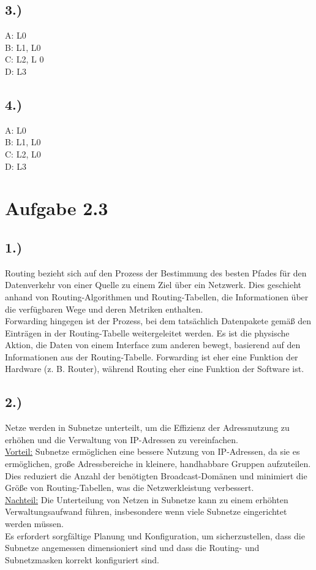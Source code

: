 \documentclass[a4paper]{scrartcl}
\begin{document}
\subsection*{3.)}
A: L0 \\
B: L1, L0 \\
C: L2, L 0 \\
D: L3 
\subsection*{4.)}
A: L0 \\
B: L1, L0 \\
C: L2, L0 \\
D: L3 

\section*{Aufgabe 2.3}
\subsection*{1.)}
Routing bezieht sich auf den Prozess der Bestimmung des besten Pfades für den Datenverkehr von einer Quelle zu einem Ziel über ein Netzwerk. 
Dies geschieht anhand von Routing-Algorithmen und Routing-Tabellen, die Informationen über die verfügbaren Wege und deren Metriken enthalten. \\
Forwarding hingegen ist der Prozess, bei dem tatsächlich Datenpakete gemäß den Einträgen in der Routing-Tabelle weitergeleitet werden. 
Es ist die physische Aktion, die Daten von einem Interface zum anderen bewegt, basierend auf den Informationen aus der Routing-Tabelle. 
Forwarding ist eher eine Funktion der Hardware (z. B. Router), während Routing eher eine Funktion der Software ist.
\subsection*{2.)}
Netze werden in Subnetze unterteilt, um die Effizienz der Adressnutzung zu erhöhen und die Verwaltung von IP-Adressen zu vereinfachen. \\
\underline{Vorteil:} Subnetze ermöglichen eine bessere Nutzung von IP-Adressen, da sie es ermöglichen, große Adressbereiche in kleinere, handhabbare Gruppen aufzuteilen. \\
Dies reduziert die Anzahl der benötigten Broadcast-Domänen und minimiert die Größe von Routing-Tabellen, was die Netzwerkleistung verbessert.\\
\underline{Nachteil:} Die Unterteilung von Netzen in Subnetze kann zu einem erhöhten Verwaltungsaufwand führen, insbesondere wenn viele Subnetze eingerichtet werden müssen. \\
Es erfordert sorgfältige Planung und Konfiguration, um sicherzustellen, dass die Subnetze angemessen dimensioniert sind und dass die Routing- und Subnetzmasken korrekt konfiguriert sind.
\end{document}

